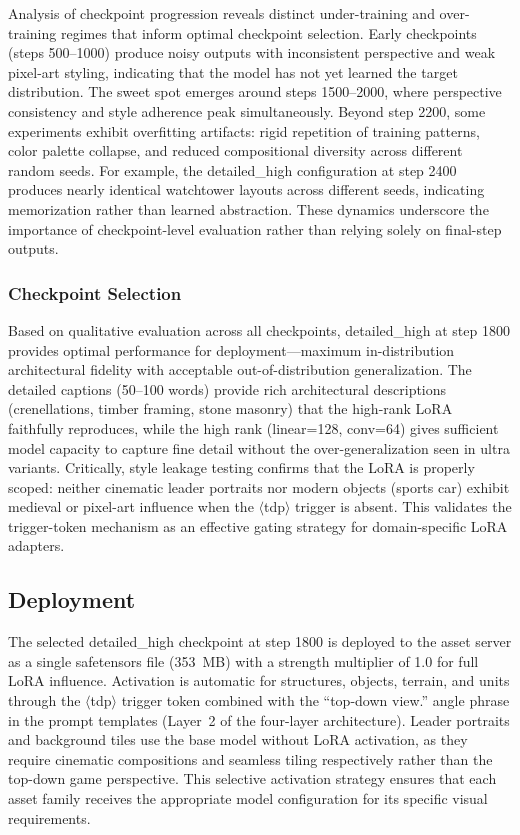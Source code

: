 \documentclass[conference]{IEEEtran}
\begin{document}
Analysis of checkpoint progression reveals distinct under-training and over-training regimes that inform optimal checkpoint selection. Early checkpoints (steps 500--1000) produce noisy outputs with inconsistent perspective and weak pixel-art styling, indicating that the model has not yet learned the target distribution. The sweet spot emerges around steps 1500--2000, where perspective consistency and style adherence peak simultaneously. Beyond step 2200, some experiments exhibit overfitting artifacts: rigid repetition of training patterns, color palette collapse, and reduced compositional diversity across different random seeds. For example, the detailed\_high configuration at step 2400 produces nearly identical watchtower layouts across different seeds, indicating memorization rather than learned abstraction. These dynamics underscore the importance of checkpoint-level evaluation rather than relying solely on final-step outputs.

\subsubsection{Checkpoint Selection}

Based on qualitative evaluation across all checkpoints, detailed\_high at step 1800 provides optimal performance for deployment---maximum in-distribution architectural fidelity with acceptable out-of-distribution generalization. The detailed captions (50--100 words) provide rich architectural descriptions (crenellations, timber framing, stone masonry) that the high-rank LoRA faithfully reproduces, while the high rank (linear=128, conv=64) gives sufficient model capacity to capture fine detail without the over-generalization seen in ultra variants. Critically, style leakage testing confirms that the LoRA is properly scoped: neither cinematic leader portraits nor modern objects (sports car) exhibit medieval or pixel-art influence when the $\langle$tdp$\rangle$ trigger is absent. This validates the trigger-token mechanism as an effective gating strategy for domain-specific LoRA adapters.

\subsection{Deployment}

The selected detailed\_high checkpoint at step 1800 is deployed to the asset server as a single safetensors file (353~MB) with a strength multiplier of 1.0 for full LoRA influence. Activation is automatic for structures, objects, terrain, and units through the $\langle$tdp$\rangle$ trigger token combined with the ``top-down view.'' angle phrase in the prompt templates (Layer~2 of the four-layer architecture). Leader portraits and background tiles use the base model without LoRA activation, as they require cinematic compositions and seamless tiling respectively rather than the top-down game perspective. This selective activation strategy ensures that each asset family receives the appropriate model configuration for its specific visual requirements.
\end{document}
